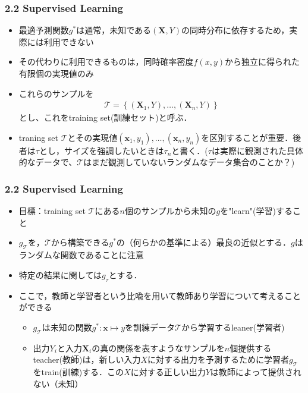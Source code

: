 \documentclass[dvipdfmx,cjk]{beamer}
\theoremstyle{example}
\begin{document}
\begin{frame}
    \frametitle{2.2 Supervised Learning}
    \begin{itemize}
        \item 最適予測関数$g^*$は通常，未知である$(\boldsymbol{X},Y)$の同時分布に依存するため，実際には利用できない
        \item その代わりに利用できるものは，同時確率密度$f(x,y)$から独立に得られた有限個の実現値のみ
        \item これらのサンプルを
              \begin{align*}
                  \mathcal{T} =\left\{(\boldsymbol{X}_1,Y),\dots,(\boldsymbol{X}_n,Y)\right\}
              \end{align*}
              とし、これをtraining set(訓練セット)と呼ぶ．
        \item traning set $\mathcal{T}$とその実現値$(\boldsymbol{x}_1,y_1),\dots,(\boldsymbol{x}_n,y_n)$を区別することが重要．後者は$\tau$とし，サイズを強調したいときは$\tau_n$と書く．($\tau$は実際に観測された具体的なデータで、$\mathcal{T}$はまだ観測していないランダムなデータ集合のことか？)
    \end{itemize}
\end{frame}

\begin{frame}
    \frametitle{2.2 Supervised Learning}
    \begin{itemize}
        \item 目標：training set $\mathcal{T}$にある$n$個のサンプルから未知の$g$を"learn"(学習)すること
        \item $g_\mathcal{T}$を，$\mathcal{T}$から構築できる$g^*$の（何らかの基準による）最良の近似とする．$g$はランダムな関数であることに注意
        \item 特定の結果に関しては$g_\tau$とする．
        \item ここで，教師と学習者という比喩を用いて教師あり学習について考えることができる
              \begin{itemize}
                  \item $g_\mathcal{T}$は未知の関数$g^*:\boldsymbol{x}\mapsto y$を訓練データ$\mathcal{T}$から学習するleaner(学習者)
                  \item 出力$Y_i$と入力$\boldsymbol{X}_i$の真の関係を表すようなサンプルを$n$個提供するteacher(教師)は，新しい入力$X$に対する出力を予測するために学習者$g_\mathcal{T}$をtrain(訓練)する．この$X$に対する正しい出力$Y$は教師によって提供されない（未知）
              \end{itemize}
    \end{itemize}
\end{frame}
\end{document}
